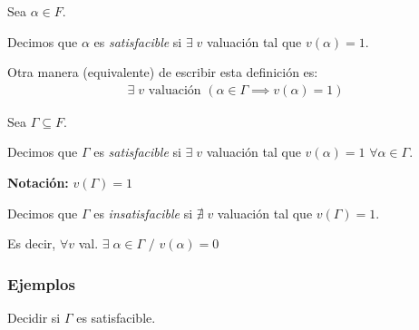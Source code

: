 \medskip

\begin{definicion}{}{}
    Sea $\alpha \in F$.
    
    \medskip

    Decimos que $\alpha$ es \textit{satisfacible} si $\exists \; v$ valuación tal que
    $v(\alpha) = 1$.
\end{definicion}

Otra manera (equivalente) de escribir esta definición es:
\begin{gather*}
    \exists \; v \text{ valuación } (\alpha \in \Gamma \implies v(\alpha) = 1)
\end{gather*}

\medskip

\begin{definicion}{}{}
    Sea $\Gamma \subseteq F$.

    \medskip

    Decimos que $\Gamma$ es \textit{satisfacible} si $\exists \; v$ valuación tal que
    $v(\alpha) = 1$ $\forall \alpha \in \Gamma$.

    \bigskip
    \textbf{Notación:}
    $v(\Gamma) = 1$ 

    \medskip

    Decimos que $\Gamma$ es \textit{insatisfacible} si $\nexists \; v$ 
    valuación tal que $v(\Gamma)=1$.

    Es decir, $\forall v$ val. $\exists \; \alpha \in \Gamma$ $/$ $v(\alpha)=0$
\end{definicion}

\subsubsection{Ejemplos}

Decidir si $\Gamma$ es satisfacible.

